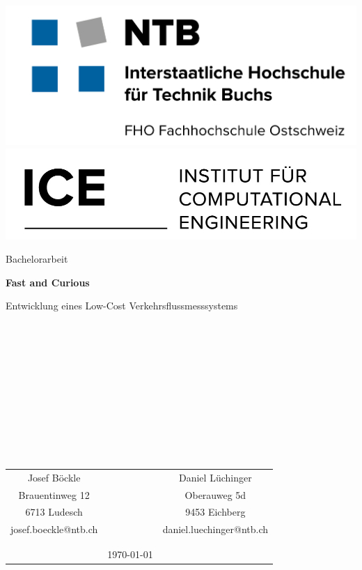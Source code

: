 \begin{titlepage}
	\includegraphics[height=0.05\textheight]{Deckblatt/NTB.jpg}
	\hfill
  	\includegraphics[height=0.05\textheight]{Deckblatt/ICE.jpg}
  	
	\thispagestyle{empty} %
	
	\vspace{6cm}
	
	\centering
	
	
	\begin{huge} 
		Bachelorarbeit
	\end{huge}
	
	\vspace{2cm}

	\fontsize{45pt}{30pt}\selectfont
	\textbf{Fast and Curious }

	

	\vspace{1cm}
	
	\fontsize{20pt}{20pt}\selectfont	
	Entwicklung eines Low-Cost Verkehrsflussmesssystems 
	\fontsize{11pt}{11pt}\selectfont	

\begin{verbatim}











\end{verbatim}

\begin{center}
  \begin{tabular}[p{3cm}p{10cm}p{3cm}]{ccc}
  \\
	Josef Böckle      & & Daniel Lüchinger \\[1.2ex]
	Brauentinweg 12  & & Oberauweg 5d \\[1.2ex]
	6713 Ludesch 	   & & 9453 Eichberg \\ [1.2ex]
	josef.boeckle@ntb.ch   & & daniel.luechinger@ntb.ch\\\\\\ [1.2ex]
	& \large{\today} &
  \end{tabular}


\end{center}
\end{titlepage}
